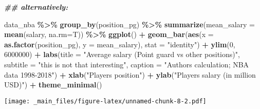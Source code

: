\documentclass[
]{book}
\newenvironment{Shaded}{\begin{snugshade}}{\end{snugshade}}
\newcommand{\AttributeTok}[1]{\textcolor[rgb]{0.13,0.29,0.53}{#1}}
\newcommand{\DecValTok}[1]{\textcolor[rgb]{0.00,0.00,0.81}{#1}}
\newcommand{\DocumentationTok}[1]{\textcolor[rgb]{0.56,0.35,0.01}{\textbf{\textit{#1}}}}
\newcommand{\FunctionTok}[1]{\textcolor[rgb]{0.13,0.29,0.53}{\textbf{#1}}}
\newcommand{\NormalTok}[1]{#1}
\newcommand{\SpecialCharTok}[1]{\textcolor[rgb]{0.81,0.36,0.00}{\textbf{#1}}}
\newcommand{\StringTok}[1]{\textcolor[rgb]{0.31,0.60,0.02}{#1}}
\begin{document}
\begin{Shaded}
\begin{Highlighting}[]
\DocumentationTok{\#\# alternatively:}

\NormalTok{data\_nba }\SpecialCharTok{\%\textgreater{}\%} 
  \FunctionTok{group\_by}\NormalTok{(position\_pg) }\SpecialCharTok{\%\textgreater{}\%}
  \FunctionTok{summarize}\NormalTok{(}\AttributeTok{mean\_salary =} \FunctionTok{mean}\NormalTok{(salary, }\AttributeTok{na.rm=}\NormalTok{T)) }\SpecialCharTok{\%\textgreater{}\%}
  \FunctionTok{ggplot}\NormalTok{() }\SpecialCharTok{+}
  \FunctionTok{geom\_bar}\NormalTok{(}\FunctionTok{aes}\NormalTok{(}\AttributeTok{x =} \FunctionTok{as.factor}\NormalTok{(position\_pg), }
               \AttributeTok{y =}\NormalTok{ mean\_salary),}
           \AttributeTok{stat =} \StringTok{"identity"}\NormalTok{) }\SpecialCharTok{+} 
  \FunctionTok{ylim}\NormalTok{(}\DecValTok{0}\NormalTok{, }\DecValTok{6000000}\NormalTok{) }\SpecialCharTok{+}
  \FunctionTok{labs}\NormalTok{(}\AttributeTok{title =} \StringTok{"Average salary (Point guard vs other positions)"}\NormalTok{,}
       \AttributeTok{subtitle =} \StringTok{"this is not that interesting"}\NormalTok{,}
       \AttributeTok{caption =} \StringTok{"Authors\textquotesingle{} calculation; NBA data 1998{-}2018"}\NormalTok{) }\SpecialCharTok{+}
  \FunctionTok{xlab}\NormalTok{(}\StringTok{"Player\textquotesingle{}s position"}\NormalTok{) }\SpecialCharTok{+}
  \FunctionTok{ylab}\NormalTok{(}\StringTok{"Player\textquotesingle{}s salary (in million USD)"}\NormalTok{) }\SpecialCharTok{+}
  \FunctionTok{theme\_minimal}\NormalTok{()}
\end{Highlighting}
\end{Shaded}

\texttt{[image: \_main\_files/figure-latex/unnamed-chunk-8-2.pdf]}
\end{document}
